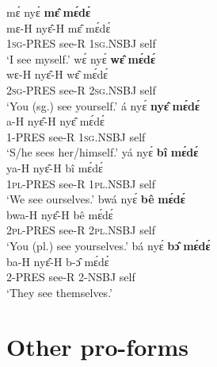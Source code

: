 \begin{exe} 
\ex\label{mede}
\begin{xlist}
\ex\label{medea}
  \glll  mɛ́ nyɛ́ {\bfseries mɛ̂} {\bfseries mɛ́dɛ́} \\
          mɛ-H nyɛ̂-H mɛ̂ mɛ́dɛ́   \\
          1\textsc{sg}-PRES see-R 1\textsc{sg}.NSBJ self   \\
    \trans `I see myself.'
\ex\label{medeb}
  \glll  wɛ́ nyɛ́ {\bfseries wɛ̂} {\bfseries mɛ́dɛ́} \\
          wɛ-H nyɛ̂-H wɛ̂ mɛ́dɛ́   \\
          2\textsc{sg}-PRES see-R 2\textsc{sg}.NSBJ self   \\
    \trans `You (sg.) see yourself.'
\ex\label{medec}
  \glll  á nyɛ́ {\bfseries nyɛ̂} {\bfseries mɛ́dɛ́} \\
          a-H nyɛ̂-H nyɛ̂ mɛ́dɛ́   \\
          1-PRES see-R 1\textsc{sg}.NSBJ self   \\
    \trans `S/he sees her/himself.'
\ex\label{meded}
  \glll  yá nyɛ́ {\bfseries bî} {\bfseries mɛ́dɛ́} \\
          ya-H nyɛ̂-H bî mɛ́dɛ́   \\
          1\textsc{pl}-PRES see-R 1\textsc{pl}.NSBJ self   \\
    \trans `We see ourselves.'
\ex\label{medee}
  \glll  bwá nyɛ́ {\bfseries bê} {\bfseries mɛ́dɛ́} \\
          bwa-H nyɛ̂-H bê mɛ́dɛ́   \\
          2\textsc{pl}-PRES see-R 2\textsc{pl}.NSBJ self   \\
    \trans `You (pl.) see yourselves.'
\ex\label{medef}
  \glll  bá nyɛ́ {\bfseries bɔ̂} {\bfseries mɛ́dɛ́} \\
          ba-H nyɛ̂-H b-ɔ̂ mɛ́dɛ́   \\
          2-PRES see-R 2-NSBJ self   \\
    \trans `They see themselves.'
\end{xlist}
\end{exe}



















\section{Other pro-forms}
\label{sec:proform}

